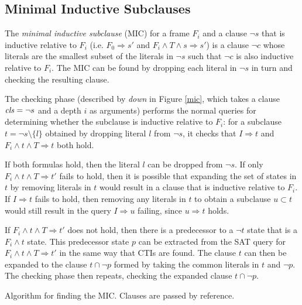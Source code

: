 \documentclass[12pt,a4paper,twoside,openright]{report}
\begin{document}
{{\subsection{Minimal Inductive Subclauses}
The \emph{minimal inductive subclause} (MIC) for a frame $F_i$ and a clause $\neg s$ that
is inductive relative to $F_i$
(i.e. $F_0 \Rightarrow s'$ and $F_i \wedge T \wedge s \Rightarrow s'$)
is a clause $\neg c$ whose
literals are the smallest subset of the literals in $\neg s$ such that
$\neg c$ is also inductive relative to $F_i$.
The MIC can be found by dropping each literal
in $\neg s$ in turn and checking the resulting clause.

The checking phase (described by {\it down} in Figure \ref{mic},
which takes a clause ${\it cls} = \neg s$ and a depth $i$ as arguments)
performs the normal queries
for determining whether the subclause is inductive relative to
$F_i$: for a subclause $t = \neg s \setminus \{l\}$ obtained by dropping
literal $l$ from $\neg s$, it checks that
$I \Rightarrow t$ and $F_i \wedge t \wedge T \Rightarrow t$ both hold.

If both formulas hold, then the literal $l$ can be dropped from $\neg s$.
If only $F_i \wedge t \wedge T \Rightarrow t'$ fails to hold, then
it is possible that expanding the set of states in $t$ by removing %
literals in $t$ would result in a clause that is inductive relative to $F_i$.
If $I \Rightarrow t$ fails to hold, then removing any literals in $t$ to
obtain a subclause $u \subset t$ would still result in the query $I \Rightarrow u$
failing, since $u \Rightarrow t$ holds.

If $F_i \wedge t \wedge T \Rightarrow t'$ does not hold, then
there is a predecessor to a $\neg t$ state that is a $F_i \wedge t$ state.
This predecessor state $p$ can be extracted from the SAT query for
$F_i \wedge t \wedge T \Rightarrow t'$ in the same way that CTIs are found.
The clause $t$ can then be expanded to the clause $t \cap \neg p$
formed by taking the common literals in $t$ and $\neg p$.
The checking phase then repeats, checking the expanded clause $t \cap \neg p$.

\begin{algorithm}[t]
\DontPrintSemicolon
{}
\caption{Algorithm for finding the MIC. Clauses are
passed by reference.}
\label{mic}
\end{algorithm}

}}
\end{document}
